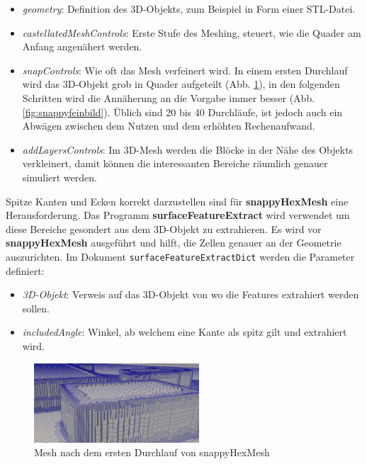 \begin{itemize}
    \item \textit{geometry}: Definition des 3D-Objekts, zum Beispiel in Form einer STL-Datei.
    \item \textit{castellatedMeshControls}: Erste Stufe des Meshing, steuert, wie die Quader am Anfang angenähert werden.
    \item \textit{snapControls}: Wie oft das Mesh verfeinert wird. 
    In einem ersten Durchlauf wird das 3D-Objekt grob in Quader aufgeteilt (Abb. \ref{fig:snappygrobbild}),
    in den folgenden Schritten wird die Annäherung an die Vorgabe immer besser (Abb. \ref{fig:snappyfeinbild}).
    Üblich sind 20 bis 40 Durchläufe, ist jedoch auch ein Abwägen zwischen dem Nutzen und dem erhöhten Rechenaufwand.
    \item \textit{addLayersControls}: Im 3D-Mesh werden die Blöcke in der Nähe des Objekts verkleinert, 
    damit können die interessanten Bereiche räumlich genauer simuliert werden.
\end{itemize}
Spitze Kanten und Ecken korrekt darzustellen sind für \textbf{snappyHexMesh} eine Herausforderung.
Das Programm \textbf{surfaceFeatureExtract} wird verwendet um diese Bereiche gesondert aus dem 3D-Objekt zu extrahieren.
Es wird vor \textbf{snappyHexMesh} ausgeführt und hilft, die Zellen genauer an der Geometrie auszurichten.
Im Dokument \texttt{surfaceFeatureExtractDict} werden die Parameter definiert:

\begin{itemize}
    \item \textit{3D-Objekt}: Verweis auf das 3D-Objekt von wo die Features extrahiert werden sollen.
    \item \textit{includedAngle}: Winkel, ab welchem eine Kante als spitz gilt und extrahiert wird.
\end{itemize}

\begin{figure}
    \centering
    \includegraphics[width=0.55\textwidth]{papers/openfoam/Bilder/Snappy_grob.png}
    \caption{Mesh nach dem ersten Durchlauf von snappyHexMesh}
    \label{fig:snappygrobbild}
\end{figure}

